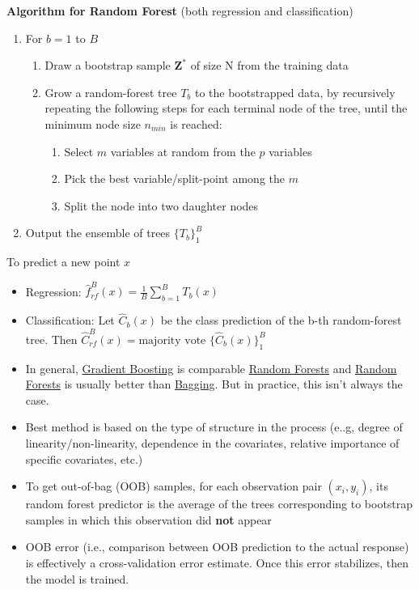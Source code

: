 \documentclass[
]{book}
\begin{document}
\textbf{Algorithm for Random Forest} (both regression and classification) \citep[Alg 15.1]{hastie2001a}

\begin{enumerate}
\def\labelenumi{\arabic{enumi}.}
\item
  For \(b = 1\) to \(B\)

  \begin{enumerate}
  \def\labelenumii{\arabic{enumii}.}
  \item
    Draw a bootstrap sample \(\mathbf{Z}^*\) of size N from the training data
  \item
    Grow a random-forest tree \(T_b\) to the bootstrapped data, by recursively repeating the following steps for each terminal node of the tree, until the minimum node size \(n_{min}\) is reached:

    \begin{enumerate}
    \def\labelenumiii{\arabic{enumiii}.}
    \item
      Select \(m\) variables at random from the \(p\) variables
    \item
      Pick the best variable/split-point among the \(m\)
    \item
      Split the node into two daughter nodes
    \end{enumerate}
  \end{enumerate}
\item
  Output the ensemble of trees \(\{T_b\}^B_1\)
\end{enumerate}

To predict a new point \(x\)

\begin{itemize}
\item
  Regression: \(\hat{f}_{rf}^B(x) = \frac{1}{B}\sum_{b=1}^B T_b(x)\)
\item
  Classification: Let \(\hat{C}_b (x)\) be the class prediction of the b-th random-forest tree. Then \(\hat{C}_{rf}^B (x) = \text{majority vote } \{\hat{C}_b (x) \}^B_{1}\)
\end{itemize}

\begin{itemize}
\item
  In general, \protect\hyperlink{gradient-boosting}{Gradient Boosting} is comparable \protect\hyperlink{random-forests}{Random Forests} and \protect\hyperlink{random-forests}{Random Forests} is usually better than \protect\hyperlink{bagging}{Bagging}. But in practice, this isn't always the case.
\item
  Best method is based on the type of structure in the process (e..g, degree of linearity/non-linearity, dependence in the covariates, relative importance of specific covariates, etc.)
\item
  To get out-of-bag (OOB) samples, for each observation pair \((x_i, y_i)\), its random forest predictor is the average of the trees corresponding to bootstrap samples in which this observation did \textbf{not} appear
\item
  OOB error (i.e., comparison between OOB prediction to the actual response) is effectively a cross-validation error estimate. Once this error stabilizes, then the model is trained.
\end{itemize}
\end{document}

